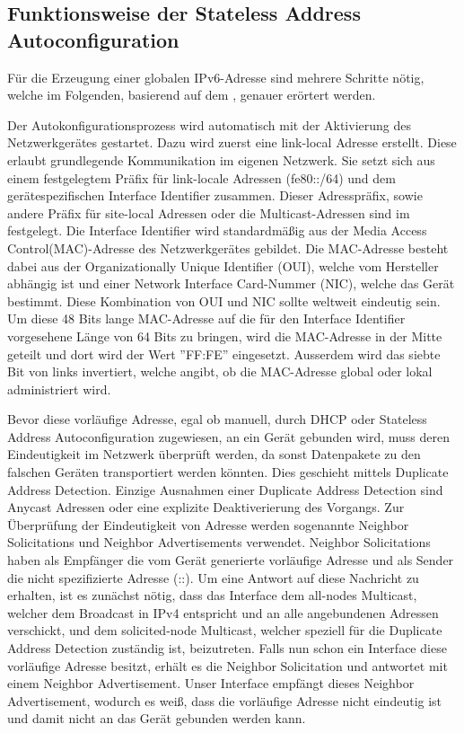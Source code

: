 \documentclass[a4paper, 12pt]{scrartcl}
\begin{document}
\subsection{Funktionsweise der Stateless Address Autoconfiguration}
Für die Erzeugung einer globalen IPv6-Adresse sind mehrere Schritte nötig, welche im Folgenden, basierend auf dem \cite{rfc4862}, genauer erörtert werden.


Der Autokonfigurationsprozess wird automatisch mit der Aktivierung des Netzwerkgerätes gestartet.
Dazu wird zuerst eine link-local Adresse erstellt. Diese erlaubt grundlegende Kommunikation im eigenen Netzwerk.
Sie setzt sich aus einem festgelegtem Präfix für link-locale Adressen (fe80::/64) und dem gerätespezifischen Interface Identifier zusammen.
Dieser Adresspräfix, sowie andere Präfix für site-local Adressen oder die Multicast-Adressen sind im \cite{rfc3513} festgelegt.
Die Interface Identifier wird standardmäßig aus der Media Access Control(MAC)-Adresse des Netzwerkgerätes gebildet.
Die MAC-Adresse besteht dabei aus der Organizationally Unique Identifier (OUI), welche vom Hersteller abhängig ist und einer Network Interface Card-Nummer (NIC), welche das Gerät bestimmt. Diese Kombination von OUI und NIC sollte weltweit eindeutig sein.
Um diese 48 Bits lange MAC-Adresse auf die für den Interface Identifier vorgesehene Länge von 64 Bits zu bringen, wird die MAC-Adresse in der Mitte geteilt und dort wird der Wert ''FF:FE'' eingesetzt. Ausserdem wird das siebte Bit von links invertiert, welche angibt, ob die MAC-Adresse global oder lokal administriert wird.

Bevor diese vorläufige Adresse, egal ob manuell, durch DHCP oder Stateless Address Autoconfiguration zugewiesen, an ein Gerät gebunden wird, muss deren Eindeutigkeit im Netzwerk überprüft werden, da sonst Datenpakete zu den falschen Geräten transportiert werden könnten. Dies geschieht mittels Duplicate Address Detection.
Einzige Ausnahmen einer Duplicate Address Detection sind Anycast Adressen oder eine explizite Deaktiverierung des Vorgangs.
Zur Überprüfung der Eindeutigkeit von Adresse werden sogenannte Neighbor Solicitations und Neighbor Advertisements verwendet. Neighbor Solicitations haben als Empfänger die vom Gerät generierte vorläufige Adresse und als Sender die nicht spezifizierte Adresse (::).
Um eine Antwort auf diese Nachricht zu erhalten, ist es zunächst nötig, dass das Interface dem all-nodes Multicast, welcher dem Broadcast in IPv4 entspricht und an alle angebundenen Adressen verschickt, und dem solicited-node Multicast, welcher speziell für die Duplicate Address Detection zuständig ist, beizutreten.
Falls nun schon ein Interface diese vorläufige Adresse besitzt, erhält es die Neighbor Solicitation und antwortet mit einem Neighbor Advertisement. 
Unser Interface empfängt dieses Neighbor Advertisement, wodurch es weiß, dass die vorläufige Adresse nicht eindeutig ist und damit nicht an das Gerät gebunden werden kann.
\end{document}
